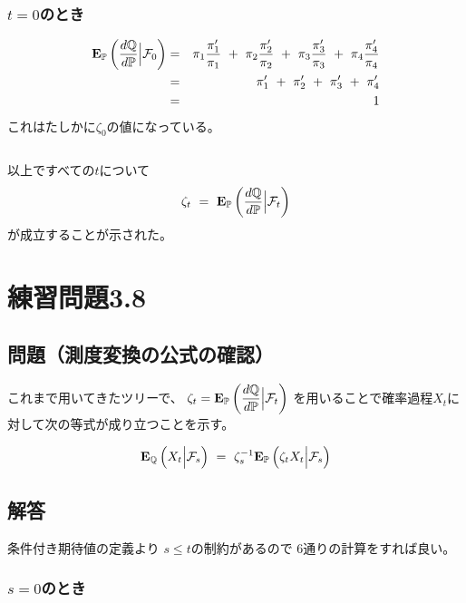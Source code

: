 \documentclass[uplatex,a4j,12pt,dvipdfmx]{jsarticle}
\begin{document}
\subsubsection{$t=0$のとき}

%
\begin{eqnarray*}
	{\bf E}_{\mathbb{P}}
	\left( \dfrac{ d \mathbb{Q} }{ d \mathbb{P} } \Big| \mathcal{F}_{0} \right)
	&=&
	\pi_{1} \dfrac{ \pi'_{1} }{ \pi_{1} }
	\ + \
	\pi_{2} \dfrac{ \pi'_{2} }{ \pi_{2} }
	\ + \
	\pi_{3} \dfrac{ \pi'_{3} }{ \pi_{3} }
	\ + \
	\pi_{4} \dfrac{ \pi'_{4} }{ \pi_{4} }
	\\ &=&
	\pi'_{1}
	\ + \
	\pi'_{2}
	\ + \
	\pi'_{3}
	\ + \
	\pi'_{4}
	\\ &=& 1
\end{eqnarray*}
%
これはたしかに$\zeta_{0}$の値になっている。

${}$

以上ですべての$t$について
$$
	\zeta_{t}
	\ = \
	{\bf E}_{\mathbb{P}}
	\left( \dfrac{ d \mathbb{Q} }{ d \mathbb{P} } \Big| \mathcal{F}_{t} \right)
$$
が成立することが示された。

\if0

	\section{練習問題3.8}

	\subsection{問題（測度変換の公式の確認）}

	これまで用いてきたツリーで、
	$\zeta_{t}
		=
		{\bf E}_{\mathbb{P}}
		\left( \dfrac{ d \mathbb{Q} }{ d \mathbb{P} } \Big| \mathcal{F}_{t} \right)$
	を用いることで確率過程$X_{t}$に対して次の等式が成り立つことを示す。

	$$
		{\bf E}_{\mathbb{Q}}
		\left( X_{t} \Big| \mathcal{F}_{s} \right)
		\ = \
		\zeta_{s}^{-1}
		{\bf E}_{\mathbb{P}}
		\left( \zeta_{t} X_{t} \Big| \mathcal{F}_{s} \right)
	$$
	\subsection{解答}

	条件付き期待値の定義より
	$s \leq t$の制約があるので
	6通りの計算をすれば良い。

	\subsubsection{ $s=0$のとき }
\end{document}
